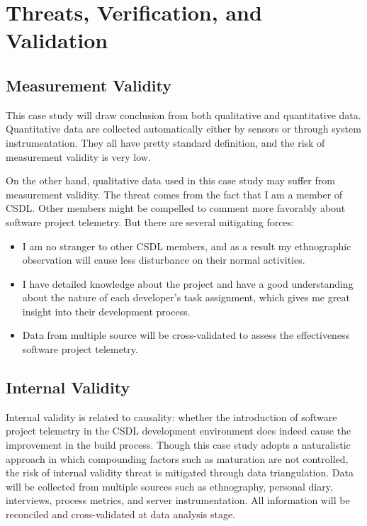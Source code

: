 \section{Threats, Verification, and Validation}  \label{EvaluationInCSDL:Threats}


\subsection{Measurement Validity}

This case study will draw conclusion from both qualitative and quantitative data. Quantitative data are collected automatically either by sensors or through system instrumentation. They all have pretty standard definition, and the risk of measurement validity is very low.

On the other hand, qualitative data used in this case study may suffer from measurement validity. The threat comes from the fact that I am a member of CSDL. Other members might be compelled to comment more favorably about software project telemetry. But there are several mitigating forces:

\begin{itemize}
	\item I am no stranger to other CSDL members, and as a result my ethnographic observation will cause less disturbance on their normal activities.
	\item I have detailed knowledge about the project and have a good understanding about the nature of each developer's task assignment, which gives me great insight into their development process.
	\item Data from multiple source will be cross-validated to assess the effectiveness software project telemetry.
\end{itemize}













\subsection{Internal Validity}

Internal validity is related to causality: whether the introduction of software project telemetry in the CSDL development environment does indeed cause the improvement in the build process. Though this case study adopts a naturalistic approach in which compounding factors such as maturation are not controlled, the risk of internal validity threat is mitigated through data triangulation. Data will be collected from multiple sources such as ethnography, personal diary, interviews, process metrics, and server instrumentation. All information will be reconciled and cross-validated at data analysis stage. 





